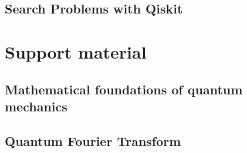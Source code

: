 \documentclass[
oneside,
11pt, a4paper,
footinclude=true,
headinclude=true,
cleardoublepage=empty
]{scrbook}
\begin{document}
\section{Search Problems with Qiskit}










\chapter{Support material}
\section{Mathematical foundations of quantum mechanics}

\section{Quantum Fourier Transform}\label{sec:chapQFT}


\end{document}
